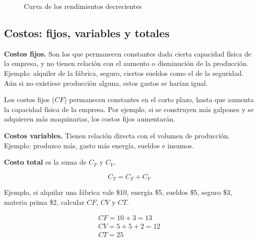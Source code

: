 \vspace{.5cm}
\begin{figure}[H]
    \centering
    \caption{Curva de los rendimientos decrecientes}
    \vspace{.25cm}
\end{figure}
\vspace{.5cm}

\subsection{Costos: fijos, variables y totales}

\textbf{Costos fijos.}
Son los que permanecen constantes dada cierta capacidad física de la empresa,
y no tienen relación con el aumento o disminución de la producción.
Ejemplo:
alquiler de la fábrica,
seguro,
ciertos sueldos como el de la seguridad.
Aún si no existiese producción alguna,
estos gastos se harían igual.

Los costos fijos (\(CF\)) permanecen constantes en el corto plazo,
hasta que aumenta la capacidad física de la empresa.
Por ejemplo, 
si se construyen más galpones y se adquieren más maquinarias,
los costos fijos aumentarán.

\textbf{Costos variables.}
Tienen relación directa con el volumen de producción.
Ejemplo: produzco más, gasto más energía, sueldos e insumos.

\textbf{Costo total} es la suma de \(C_F\) y \(C_V\).

\begin{equation*}
    C_T = C_F + C_V
\end{equation*}

Ejemplo, 
si alquilar una fábrica vale \$10,
energía \$5, sueldos \$5, seguro \$3, materia prima \$2,
calcular \(CF\), \(CV\) y \(CT\).

\begin{align*}
    CF = 10 + 3 = 13 \\
    CV = 5 + 5 + 2 = 12 \\
    CT = \boxed{25}
\end{align*}


